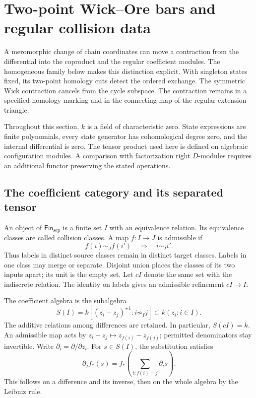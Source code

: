 \section{Two-point Wick--Ore bars and regular collision data}
\label{wo:sec}

A meromorphic change of chain coordinates can move a contraction from
the differential into the coproduct and the regular coefficient modules.
The homogeneous family below makes this distinction explicit.  With
singleton states fixed, its two-point homology cuts detect the ordered
exchange.  The symmetric Wick contraction cancels from the cycle
subspace.  The contraction
remains in a specified homology marking and in the connecting map of
the regular-extension triangle.

Throughout this section, \(k\) is a field of characteristic zero.
State expressions are finite polynomials, every state generator has
cohomological degree zero, and the internal differential is zero.
The tensor product used here is defined on algebraic configuration
modules.  A comparison with factorization right \(D\)-modules requires
an additional functor preserving the stated operations.

\subsection{The coefficient category and its separated tensor}

An object of \(\mathsf{Fin}_{\mathrm{sep}}\) is a finite set \(I\)
with an equivalence relation.  Its equivalence classes are called
collision classes.  A map \(f:I\to J\) is admissible if
\[
 f(i)\sim_J f(i')\quad\Longrightarrow\quad i\sim_I i'.
\]
Thus labels in distinct source classes remain in distinct target
classes.  Labels in one class may merge or separate.  Disjoint union
places the classes of its two inputs apart; its unit is the empty set.
Let \(cI\) denote the same set with the indiscrete relation.  The
identity on labels gives an admissible refinement \(cI\to I\).

The coefficient algebra is the subalgebra
\begin{equation}\label{wo:eq:coefficients}
 S(I)=k[(z_i-z_j)^{\pm1}:i\not\sim_I j]
       \subset k(z_i:i\in I).
\end{equation}
The additive relations among differences are retained.  In particular,
\(S(cI)=k\).  An admissible map acts by
\(z_i-z_j\mapsto z_{f(i)}-z_{f(j)}\); permitted denominators stay
invertible.  Write \(\partial_i=\partial/\partial z_i\).
For \(s\in S(I)\), the substitution satisfies
\[
 \partial_j f_*(s)
 =f_*\left(\sum_{i:f(i)=j}\partial_i s\right).
\]
This follows on a difference and its inverse, then on the whole
algebra by the Leibniz rule.

